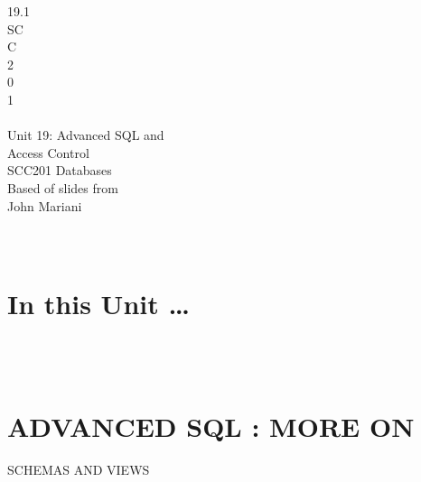 \documentclass[12pt]{article}
\begin{document}
19.1\\
SC\\
C\\
 2\\
0\\
1\\
 \\
Unit 19: Advanced SQL and \\
Access Control\\
SCC201 Databases\\
Based of slides from\\
John Mariani\\
\\ 
 \\
\section{In this Unit …}
\\ 
 \\
\section{ADVANCED SQL : MORE ON }
SCHEMAS AND VIEWS\\
\\ 
 \\
\end{document}

